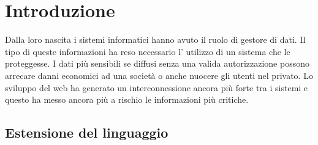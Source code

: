 \chapter{Introduzione}
Dalla loro nascita i sistemi informatici hanno avuto il ruolo di gestore di dati.
Il tipo di queste informazioni ha reso necessario l' utilizzo di un sistema che le proteggesse. I dati più sensibili se diffusi
senza una valida autorizzazione possono arrecare danni economici ad una società o anche nuocere gli utenti nel privato.
Lo sviluppo del web ha generato un interconnessione ancora più forte tra i sistemi e questo ha messo ancora più a rischio le
informazioni più critiche.\\

\section{Estensione del linguaggio}
\label{sec:Estensione del linguaggio}
